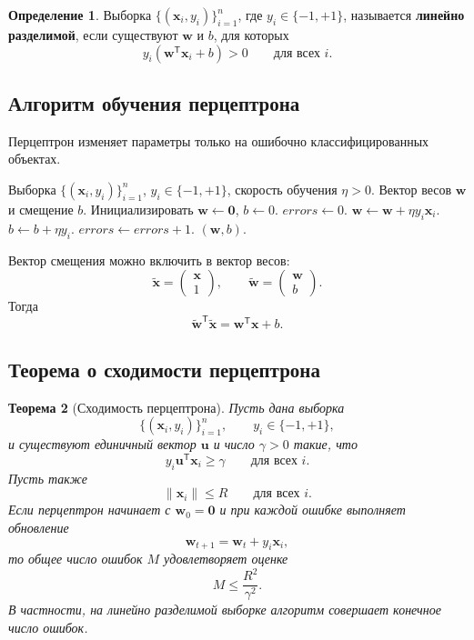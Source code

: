 \documentclass[12pt,a4paper]{article}
\newtheorem{theorem}{Теорема}[section]
\theoremstyle{definition}
\newtheorem{definition}[theorem]{Определение}
\newcommand{\T}{\mathsf{T}}
\newcommand{\1}{\mathbf{1}}
\begin{document}
\begin{definition}
Выборка $\{(\bm{x}_i,y_i)\}_{i=1}^{n}$, где $y_i\in\{-1,+1\}$,
называется \textbf{линейно разделимой}, если существуют
$\bm{w}$ и $b$, для которых
\[
    y_i(\bm{w}^{\T}\bm{x}_i+b)>0
    \qquad
    \text{для всех }i.
\]
\end{definition}

\subsection{Алгоритм обучения перцептрона}

Перцептрон изменяет параметры только на ошибочно классифицированных
объектах.

\begin{algorithm}[h]
\caption{Обучение перцептрона}
\begin{algorithmic}[1]
\Require Выборка
$\{(\bm{x}_i,y_i)\}_{i=1}^{n}$,
$y_i\in\{-1,+1\}$,
скорость обучения $\eta>0$.
\Ensure Вектор весов $\bm{w}$ и смещение $b$.
\State Инициализировать $\bm{w}\gets\bm{0}$, $b\gets 0$.
\Repeat
    \State $\textit{errors}\gets 0$.
        \If{$y_i(\bm{w}^{\T}\bm{x}_i+b)\leq 0$}
            \State $\bm{w}\gets\bm{w}+\eta y_i\bm{x}_i$.
            \State $b\gets b+\eta y_i$.
            \State $\textit{errors}\gets\textit{errors}+1$.
        \EndIf
    \EndFor
{}
\State \Return $(\bm{w},b)$.
\end{algorithmic}
\end{algorithm}

Вектор смещения можно включить в вектор весов:
\[
    \widetilde{\bm{x}}
    =
    \begin{pmatrix}
        \bm{x}\\
        1
    \end{pmatrix},
    \qquad
    \widetilde{\bm{w}}
    =
    \begin{pmatrix}
        \bm{w}\\
        b
    \end{pmatrix}.
\]
Тогда
\[
    \widetilde{\bm{w}}^{\T}\widetilde{\bm{x}}
    =
    \bm{w}^{\T}\bm{x}+b.
\]

\subsection{Теорема о сходимости перцептрона}

\begin{theorem}[Сходимость перцептрона]
Пусть дана выборка
\[
    \{(\bm{x}_i,y_i)\}_{i=1}^{n},
    \qquad
    y_i\in\{-1,+1\},
\]
и существуют единичный вектор $\bm{u}$ и число $\gamma>0$ такие, что
\[
    y_i\bm{u}^{\T}\bm{x}_i\geq\gamma
    \qquad
    \text{для всех }i.
\]
Пусть также
\[
    \|\bm{x}_i\|\leq R
    \qquad
    \text{для всех }i.
\]
Если перцептрон начинает с $\bm{w}_0=\bm{0}$ и при каждой ошибке
выполняет обновление
\[
    \bm{w}_{t+1}
    =
    \bm{w}_t+y_i\bm{x}_i,
\]
то общее число ошибок $M$ удовлетворяет оценке
\[
    M\leq\frac{R^2}{\gamma^2}.
\]
В частности, на линейно разделимой выборке алгоритм совершает конечное
число ошибок.
\end{theorem}
\end{document}
